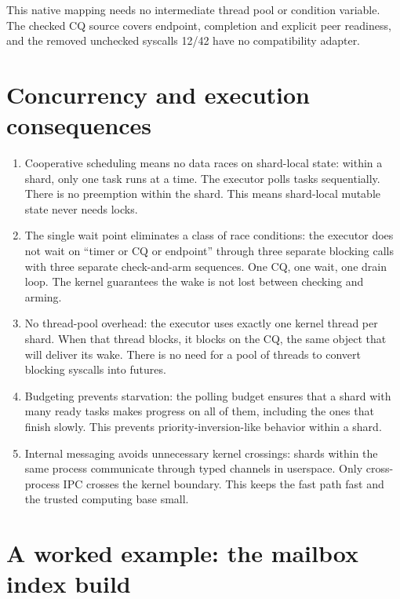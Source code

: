 This native mapping needs no intermediate thread pool or condition variable.
The checked CQ source covers endpoint, completion and explicit peer readiness, and
the removed unchecked syscalls 12/42 have no compatibility adapter.

\section{Concurrency and execution consequences}

\begin{enumerate}
    \item Cooperative scheduling means no data races on shard-local state:
        within a shard, only one task runs at a time. The executor polls tasks
        sequentially. There is no preemption within the shard. This means
        shard-local mutable state never needs locks.

    \item The single wait point eliminates a class of race conditions:
        the executor does not wait on ``timer or CQ or endpoint'' through three
        separate blocking calls with three separate check-and-arm sequences. One
        CQ, one wait, one drain loop. The kernel guarantees the wake is not lost
        between checking and arming.

    \item No thread-pool overhead: the executor uses exactly one kernel
        thread per shard. When that thread blocks, it blocks on the CQ, the same
        object that will deliver its wake. There is no need for a pool of
        threads to convert blocking syscalls into futures.

    \item Budgeting prevents starvation: the polling budget ensures that
        a shard with many ready tasks makes progress on all of them, including the
        ones that finish slowly. This prevents priority-inversion-like behavior
        within a shard.

    \item Internal messaging avoids unnecessary kernel crossings: shards
        within the same process communicate through typed channels in userspace.
        Only cross-process IPC crosses the kernel boundary. This keeps the fast
        path fast and the trusted computing base small.
\end{enumerate}

\section{A worked example: the mailbox index build}
\label{sec:sitas-mailbox-index}

